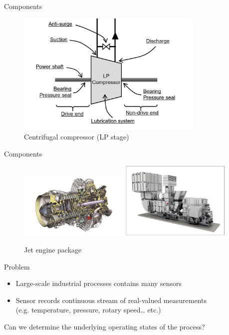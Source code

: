 \documentclass{beamer}
\begin{document}
\begin{frame}{Components}
  \begin{figure}
    \centering
    \includegraphics[width=0.8\textwidth]{lp-stage.PNG}
    \caption{Centrifugal compressor (LP stage)}
  \end{figure}
\end{frame}

\begin{frame}{Components}
  \begin{figure}
    \centering
    \includegraphics[width=0.47\textwidth]{rb211.jpg}
    \hfill
    \includegraphics[width=0.47\textwidth]{rb211_package.jpg}
    \caption{Jet engine package}
  \end{figure}
\end{frame}



\begin{frame}{Problem}
  \begin{itemize}
    \item Large-scale industrial processes contains many sensors
    \item Sensor records continuous stream of real-valued measurements \\
          (e.g. temperature, pressure, rotary speed… etc.)
  \end{itemize}
  \begin{tcolorbox}[title=Research Question]
    Can we determine the underlying operating states of the process?
  \end{tcolorbox}
\end{frame}
\end{document}
